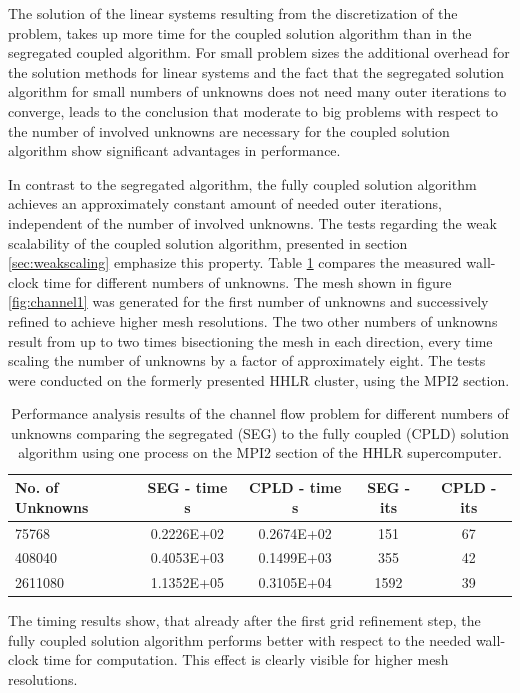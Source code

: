 The solution of the linear systems resulting from the discretization of the problem, takes up more time for the coupled solution algorithm than in the segregated coupled algorithm. For small problem sizes the additional overhead for the solution methods for linear systems and the fact that the segregated solution algorithm for small numbers of unknowns does not need many outer iterations to converge, leads to the conclusion that moderate to big problems with respect to the number of involved unknowns are necessary for the coupled solution algorithm show significant advantages in performance. 

In contrast to the segregated algorithm, the fully coupled solution algorithm achieves an approximately constant amount of needed outer iterations, independent of the number of involved unknowns. The tests regarding the weak scalability of the coupled solution algorithm, presented in section \ref{sec:weakscaling} emphasize this property. Table \ref{tab:channelcompare} compares the measured wall-clock time for different numbers of unknowns. The mesh shown in figure \ref{fig:channel1} was generated for the first number of unknowns and successively refined to achieve higher mesh resolutions. The two other numbers of unknowns result from up to two times bisectioning the mesh in each direction, every time scaling the number of unknowns by a factor of approximately eight. The tests were conducted on the formerly presented HHLR cluster, using the MPI2 section. 

\begin{table}[h!]\centering
  \caption{Performance analysis results of the channel flow problem for different numbers of unknowns comparing the segregated (SEG) to the fully coupled (CPLD) solution algorithm using one process on the MPI2 section of the HHLR supercomputer. }
  \begin{tabular}{lcccc}\toprule
    No. of Unknowns & SEG - time s & CPLD - time s & SEG - its & CPLD - its \\
    \midrule
    \rowcolor{black!20} 75768    & 0.2226E+02 & 0.2674E+02 & 151  & 67 \\
    \rowcolor{black!00} 408040   & 0.4053E+03 & 0.1499E+03 & 355  & 42 \\
    \rowcolor{black!20} 2611080  & 1.1352E+05 & 0.3105E+04 & 1592 & 39 \\
  \end{tabular}
  \label{tab:channelcompare}
\end{table}

The timing results show, that already after the first grid refinement step, the fully coupled solution algorithm performs better with respect to the needed wall-clock time for computation. This effect is clearly visible for higher mesh resolutions.

